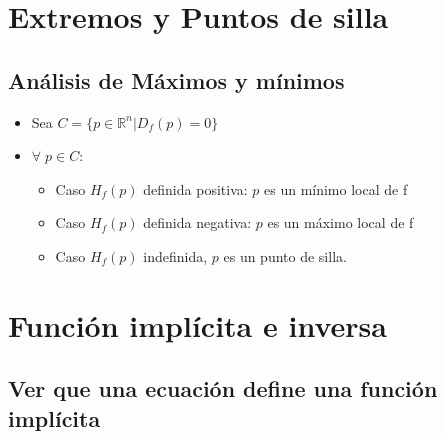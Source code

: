 \documentclass[twoside]{article}
\newcommand{\R}{\mathbb{R}}
\newcommand{\all}{\forall \;}
\begin{document}
\section{Extremos y Puntos de silla}

\subsection{Análisis de Máximos y mínimos}

\begin{itemize}


\item Sea $C = \{ p \in \R^n | D_f(p) = 0\}$

\item $\all p \in C$:
\begin{itemize}
\item Caso $H_f(p)$ definida positiva: $p$ es un mínimo local de f

\item Caso $H_f(p)$ definida negativa: $p$ es un máximo local de f

\item Caso $H_f(p)$ indefinida, $p$ es un punto de silla.

\end{itemize} 
\end{itemize}

\section{Función implícita e inversa}

\subsection{Ver que una ecuación define una función implícita}
\end{document}
